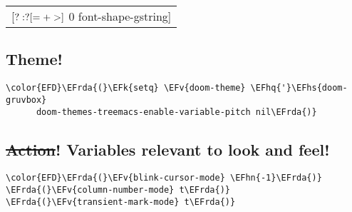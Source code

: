\documentclass{article}
\newcommand{\EFk}[1]{\textcolor{EFk}{#1}} %
\newcommand{\EFv}[1]{\textcolor{EFv}{#1}} %
\newcommand{\EFhn}[1]{\textcolor{EFhn}{\textbf{#1}}} %
\newcommand{\EFhq}[1]{#1} %
\newcommand{\EFhs}[1]{\textcolor{EFhs}{#1}} %
\newcommand{\EFrda}[1]{\textcolor{EFrda}{#1}} %
\begin{document}
\begin{center}
\begin{tabular}{l}
[\(?:\*?[=+>]\) 0 font-shape-gstring]\\[0pt]
\end{tabular}
\end{center}

\subsection{Theme!}
\label{sec:orgba32ede}
\begin{Code}
\begin{Verbatim}
\color{EFD}\EFrda{(}\EFk{setq} \EFv{doom-theme} \EFhq{'}\EFhs{doom-gruvbox}
      doom-themes-treemacs-enable-variable-pitch nil\EFrda{)}
\end{Verbatim}
\end{Code}

\subsection{\sout{Action}! Variables relevant to look and feel!}
\label{sec:orgc67c70a}
\begin{Code}
\begin{Verbatim}
\color{EFD}\EFrda{(}\EFv{blink-cursor-mode} \EFhn{-1}\EFrda{)}
\EFrda{(}\EFv{column-number-mode} t\EFrda{)}
\EFrda{(}\EFv{transient-mark-mode} t\EFrda{)}
\end{Verbatim}
\end{Code}
\end{document}
